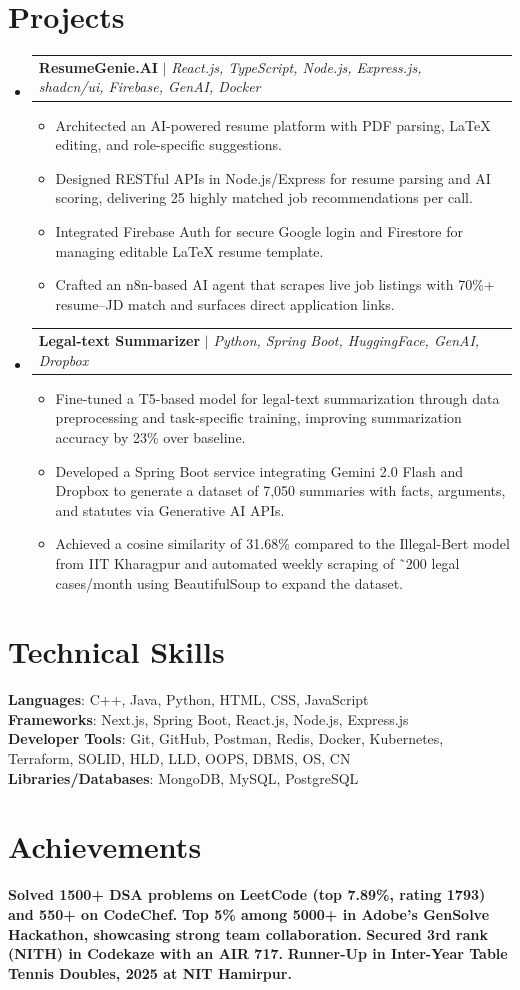 \documentclass[letterpaper,11pt]{article}
\makeatletter
\newcommand{\resumeItem}[1]{
  \item\small{
    {#1 \vspace{-2pt}}
  }
}
\newcommand{\resumeProjectHeading}[2]{
    \item
    \begin{tabular*}{0.97\textwidth}{l@{\extracolsep{\fill}}r}
      \small#1 & #2 \\
    \end{tabular*}\vspace{-7pt}
}
\newcommand{\resumeSubHeadingListStart}{\begin{itemize}[leftmargin=0.15in, label={}]}
\newcommand{\resumeSubHeadingListEnd}{\end{itemize}}
\newcommand{\resumeItemListStart}{\begin{itemize}}
\newcommand{\resumeItemListEnd}{\end{itemize}\vspace{-5pt}}
\makeatother
\begin{document}
\section{Projects}
\resumeSubHeadingListStart

      \resumeProjectHeading
      {\textbf{ResumeGenie.AI} $|$ \emph{React.js, TypeScript, Node.js, Express.js, shadcn/ui, Firebase, GenAI, Docker}}{}
      \resumeItemListStart
      \resumeItem{Architected an AI-powered resume platform with PDF parsing, LaTeX editing, and role-specific suggestions.}
\resumeItem{Designed RESTful APIs in Node.js/Express for resume parsing and AI scoring, delivering 25 highly matched job recommendations per call.}
\resumeItem{Integrated Firebase Auth for secure Google login and Firestore for managing editable LaTeX resume template.}
\resumeItem{Crafted an n8n-based AI agent that scrapes live job listings with 70\%+ resume–JD match and surfaces direct application links.}
\resumeItemListEnd

      \resumeProjectHeading
      {\textbf{Legal-text Summarizer} $|$ \emph{Python, Spring Boot, HuggingFace, GenAI, Dropbox}}{}
      \resumeItemListStart
      \resumeItem{Fine-tuned a T5-based model for legal-text summarization through data preprocessing and task-specific training, improving summarization accuracy by 23\% over baseline.}
\resumeItem{Developed a Spring Boot service integrating Gemini 2.0 Flash and Dropbox to generate a dataset of 7,050 summaries with facts, arguments, and statutes via Generative AI APIs.}
\resumeItem{Achieved a cosine similarity of 31.68\% compared to the Illegal-Bert model from IIT Kharagpur and automated weekly scraping of ˜200 legal cases/month using BeautifulSoup to expand the dataset.}
\resumeItemListEnd
\resumeSubHeadingListEnd

\section{Technical Skills}
\begin{itemize}[leftmargin=0.15in, label={}]
    \small{\item{
\textbf{Languages}{: C++, Java, Python, HTML, CSS, JavaScript} \\ 
\textbf{Frameworks}{: Next.js, Spring Boot, React.js, Node.js, Express.js} \\ 
\textbf{Developer Tools}{: Git, GitHub, Postman, Redis, Docker, Kubernetes, Terraform, SOLID, HLD, LLD, OOPS, DBMS, OS, CN} \\ 
\textbf{Libraries/Databases}{: MongoDB, MySQL, PostgreSQL} 
    }}
\end{itemize}

\section{\textbf{Achievements}}
\begin{itemize}[leftmargin=0.15in, label={}]
    \textbf{Solved 1500+ DSA problems on LeetCode (top 7.89\%, rating 1793) and 550+ on CodeChef.}
    \textbf{Top {5\%} among 5000+ in Adobe’s {GenSolve Hackathon}, showcasing strong team collaboration.}
    \textbf{Secured 3rd rank (NITH) in Codekaze with an AIR 717.}
    \textbf{{Runner-Up} in Inter-Year Table Tennis Doubles, 2025 at {NIT Hamirpur}.}
\resumeItemListEnd
\end{document}
